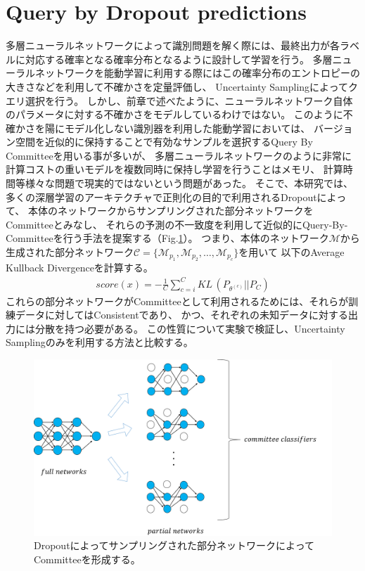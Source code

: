 \section{Query by Dropout predictions}
多層ニューラルネットワークによって識別問題を解く際には、最終出力が各ラベルに対応する確率となる確率分布となるように設計して学習を行う。
多層ニューラルネットワークを能動学習に利用する際にはこの確率分布のエントロピーの大きさなどを利用して不確かさを定量評価し、
Uncertainty Samplingによってクエリ選択を行う。
しかし、前章で述べたように、ニューラルネットワーク自体のパラメータに対する不確かさをモデルしているわけではない。
このように不確かさを陽にモデル化しない識別器を利用した能動学習においては、
バージョン空間を近似的に保持することで有効なサンプルを選択するQuery By Committeeを用いる事が多いが、
多層ニューラルネットワークのように非常に計算コストの重いモデルを複数同時に保持し学習を行うことはメモリ、
計算時間等様々な問題で現実的ではないという問題があった。
そこで、本研究では、多くの深層学習のアーキテクチャで正則化の目的で利用されるDropoutによって、
本体のネットワークからサンプリングされた部分ネットワークをCommitteeとみなし、
それらの予測の不一致度を利用して近似的にQuery-By-Committeeを行う手法を提案する（Fig.\ref{fig:query_by_dropout}）。
つまり、本体のネットワーク$\mathcal{M}$から生成された部分ネットワーク$\mathcal{C} = \{\mathcal{M}_{p_1}, \mathcal{M}_{p_2}, \dots, \mathcal{M}_{p_c} \}$を用いて
以下のAverage Kullback Divergenceを計算する。
\begin{eqnarray}
    score(x) =  -  \frac{1}{C} \sum_{c=i}^C KL \, (P_{\theta^{(c)}} || P_C)
\end{eqnarray}
これらの部分ネットワークがCommitteeとして利用されるためには、それらが訓練データに対してはConsistentであり、
かつ、それぞれの未知データに対する出力には分散を持つ必要がある。
この性質について実験で検証し、Uncertainty Samplingのみを利用する方法と比較する。

\begin{figure}[tbp]
    \label{fig:query_by_dropout}
     \begin{center}
      \includegraphics[width=120mm]{figures/query_by_dropout.png}
     \end{center}
    \caption{Dropoutによってサンプリングされた部分ネットワークによってCommitteeを形成する。}
\end{figure}

